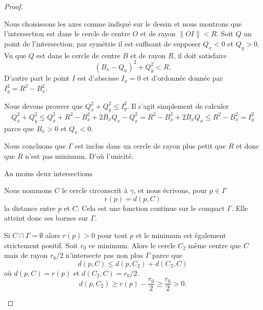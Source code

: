 \begin{proof}
\begin{subproof}
        Nous choisissons les axes comme indiqué sur le dessin et nous montrons que l'intersection est dans le cercle de centre \( O\) et de rayon \( \| OI \|<R\). Soit \( Q\) un point de l'intersection; par symétrie il est suffisant de supposer \( Q_x<0\) et \( Q_y>0\). Vu que \( Q\) est dans le cercle de centre \( B\) et de rayon \( R\), il doit satisfaire
        \begin{equation}
            (B_x-Q_x)^2+Q_{y}^2<R.
        \end{equation}
        D'autre part le point \( I\) est d'abscisse \( I_x=0\) et d'ordonnée donnée par \( I_y^2=R^2-B_x^2\). 

        Nous devons prouver que \( Q_x^2+Q_y^2\leq I_y^2\). Il s'agit simplement de calculer
        \begin{equation}
            Q_x^2+Q_y^2\leq Q_x^2+R^2-B_x^2+2B_xQ_x-Q_x^2=R^2-B_x^2+2B_xQ_x\leq R^2-B_x^2=I_y^2
        \end{equation}
        parce que \( B_x>0\) et \( Q_x<0\).

        Nous concluons que \( \Gamma\) est inclus dans un cercle de rayon plus petit que \( R\) et donc que \( R\) n'est pas minimum. D'où l'unicité.

    \item[Au moins deux intersections]

        Nous nommons \( C\) le cercle circonscrit à \( \gamma\), et nous écrivons, pour \( p\in \Gamma\) 
        \begin{equation}
            r(p)=d(p,C)
        \end{equation}
        la distance entre \( p\) et \( C\). Cela est une fonction continue sur le compact \( \Gamma\). Elle atteint donc ses bornes sur \( \Gamma\). 

        Si \( C\cap \Gamma=\emptyset\) alors \( r(p)>0\) pour tout \( p\) et le minimum est également strictement positif. Soit \( r_0\) ce minimum. Alors le cercle \( C_2\) même centre que \( C\) mais de rayon \( r_0/2\) n'intersecte pas non plus \( \Gamma\) parce que
        \begin{equation}
            d(p,C)\leq d(p,C_2)+d(C_2,C)
        \end{equation}
        où \( d(p,C)=r(p)\) et \( d(C_2,C)=r_0/2\).
        \begin{equation}
            d(p,C_2)\geq r(p)-\frac{ r_0 }{2}\geq \frac{ r_0 }{2}>0.
        \end{equation}


\end{subproof}
\end{proof}
